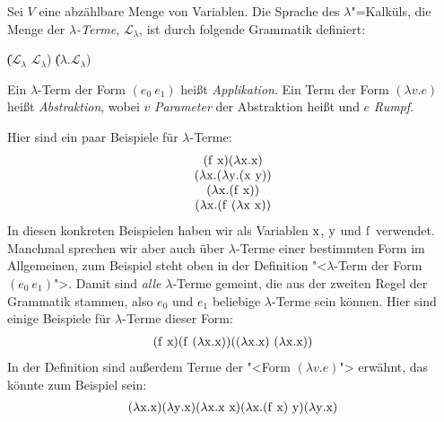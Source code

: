\begin{definition}
  
  Sei $V$ eine abzählbare Menge von Variablen. 
  Die Sprache des $\lambda$"=Kalküls, die Menge der
  \textit{$\lambda$-Terme},
  $\mathcal{L}_{\lambda}$, ist
  durch folgende Grammatik definiert:
  \begin{grammar}
     \: 
    \> \| ($\mathcal{L}_{\lambda}$ $\mathcal{L}_{\lambda}$)
    \> \| ($\lambda$.$\mathcal{L}_{\lambda}$)
  \end{grammar}
%
  Ein $\lambda$-Term der Form $(e_0~e_1)$ heißt
  \textit{Applikation}. Ein Term der Form
  $(\lambda v.e)$ heißt \textit{Abstraktion}, wobei
  $v$ \textit{Parameter} der Abstraktion heißt und
  $e$ \textit{Rumpf}.
\end{definition}
%
Hier sind ein paar Beispiele für $\lambda$-Terme:
%
\begin{displaymath}
  \begin{array}{c}
    (\mathrm f~\mathrm x)
    (\lambda \mathrm x.\mathrm x)\\
    (\lambda \mathrm x.(\lambda \mathrm y.(\mathrm x~\mathrm y))\\
    (\lambda \mathrm x.(\mathrm f~\mathrm x))\\
    (\lambda \mathrm x.(\mathrm f~(\lambda \mathrm x~\mathrm x))
  \end{array}
\end{displaymath}
% 
In diesen konkreten Beispielen haben wir als Variablen $\mathrm x$, $\mathrm y$ und
$\mathrm f$ verwendet.  Manchmal sprechen wir aber auch über
$\lambda$-Terme einer bestimmten Form im Allgemeinen, zum Beispiel
steht oben in der Definition "<$\lambda$-Term der Form
$(e_0~e_1)$">. Damit sind \emph{alle} $\lambda$-Terme gemeint, die aus der
zweiten Regel der Grammatik stammen, also $e_0$ und $e_1$ beliebige
$\lambda$-Terme sein können.  Hier sind einige Beispiele für
$\lambda$-Terme dieser Form:
%
\begin{displaymath}
  \begin{array}{c}
    (\mathrm f~\mathrm x)
    (\mathrm f~(\lambda \mathrm x.\mathrm x))
    ((\lambda \mathrm x.\mathrm x)~(\lambda \mathrm x.\mathrm x))
  \end{array}
\end{displaymath}
%
In der Definition sind außerdem Terme der "<Form $(\lambda v.e)$">
erwähnt, das könnte zum Beispiel sein:
%
\begin{displaymath}
  \begin{array}{c}
    (\lambda \mathrm x.\mathrm x)
    (\lambda \mathrm y.\mathrm x)
    (\lambda \mathrm x.\mathrm x~\mathrm x)
    (\lambda \mathrm x.(\mathrm f~\mathrm x)~\mathrm y)
    (\lambda \mathrm y.\mathrm x)
  \end{array}
\end{displaymath}
